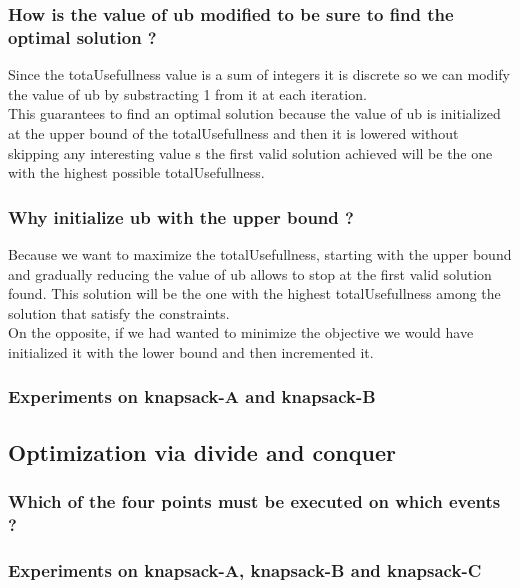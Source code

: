 \documentclass{eplDoc}
\begin{document}
\subsubsection{How is the value of ub modified to be sure to find the optimal solution ?}
Since the totaUsefullness value is a sum of integers it is discrete so we can modify the value of ub by substracting 1 from it at each iteration. \\ 
This guarantees to find an optimal solution because the value of ub is initialized at the upper bound of the totalUsefullness and then it is lowered without skipping any interesting value s the first valid solution achieved will be the one with the highest possible totalUsefullness. 

\subsubsection{Why initialize ub with the upper bound ?}
Because we want to maximize the totalUsefullness, starting with the upper bound and gradually reducing the value of ub allows to stop at the first valid solution found. This solution will be the one with the highest totalUsefullness among the solution that satisfy the constraints. \\ 
On the opposite, if we had wanted to minimize the objective we would have initialized it with the lower bound and then incremented it.

\subsubsection{Experiments on knapsack-A and knapsack-B}


\subsection{Optimization via divide and conquer} %
\subsubsection{Which of the four points must be executed on which events ?}
\subsubsection{Experiments on knapsack-A, knapsack-B and knapsack-C}
\end{document}
